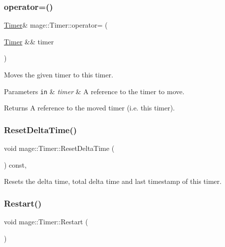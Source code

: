 \subsubsection{\texorpdfstring{operator=()}{operator=()}\hspace{0.1cm}{\footnotesize\ttfamily [2/2]}}
{\footnotesize\ttfamily \hyperlink{classmage_1_1_timer}{Timer}\& mage\+::\+Timer\+::operator= (\begin{DoxyParamCaption}\item[{\hyperlink{classmage_1_1_timer}{Timer} \&\&}]{timer }\end{DoxyParamCaption})\hspace{0.3cm}{\ttfamily [default]}}

Moves the given timer to this timer.


\begin{DoxyParams}[1]{Parameters}
\mbox{\tt in}  & {\em timer} & A reference to the timer to move. \\
\hline
\end{DoxyParams}
\begin{DoxyReturn}{Returns}
A reference to the moved timer (i.\+e. this timer). 
\end{DoxyReturn}
\hypertarget{classmage_1_1_timer_a5b66b3bfbed7cd4a3ad565abec5c3b02}{}\label{classmage_1_1_timer_a5b66b3bfbed7cd4a3ad565abec5c3b02} 
\subsubsection{\texorpdfstring{Reset\+Delta\+Time()}{ResetDeltaTime()}}
{\footnotesize\ttfamily void mage\+::\+Timer\+::\+Reset\+Delta\+Time (\begin{DoxyParamCaption}{ }\end{DoxyParamCaption}) const\hspace{0.3cm}{\ttfamily [private]}, {\ttfamily [noexcept]}}

Resets the delta time, total delta time and last timestamp of this timer. \hypertarget{classmage_1_1_timer_a47e6893e733911624ebf54d5f88cd3fd}{}\label{classmage_1_1_timer_a47e6893e733911624ebf54d5f88cd3fd} 
\subsubsection{\texorpdfstring{Restart()}{Restart()}}
{\footnotesize\ttfamily void mage\+::\+Timer\+::\+Restart (\begin{DoxyParamCaption}{ }\end{DoxyParamCaption})\hspace{0.3cm}{\ttfamily [noexcept]}}

